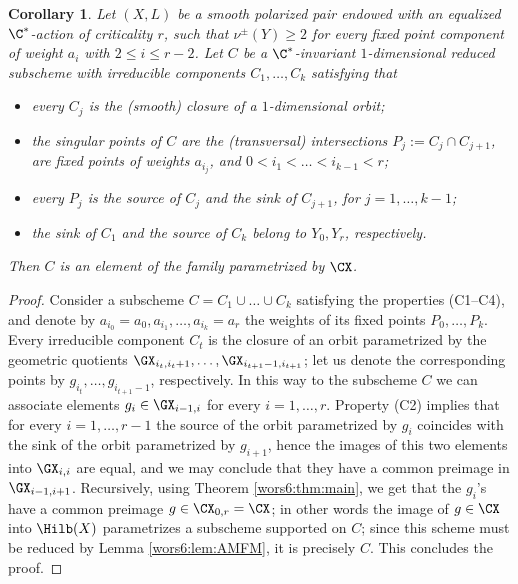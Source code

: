 \documentclass[reqno]{amsproc}
\newtheorem{corollary}[theorem]{Corollary}
\theoremstyle{definition}
\begin{document}
\begin{corollary}\label{wors6:cor:CXcontainsall}
Let $(X,L)$ be a smooth polarized pair endowed with an equalized $\C^*$-action of criticality $r$, such that $\nu^\pm(Y) \ge 2$ for every fixed point component of weight $a_i$ with $2 \le i \le r-2$.  Let $C$ be a $\C^*$-invariant $1$-dimensional reduced subscheme with irreducible components $C_1,\dots,C_k$ satisfying that 
\begin{itemize}
\item[(C1)] every $C_j$ is the (smooth) closure of a $1$-dimensional orbit; 
\item[(C2)] the singular points of $C$ are the (transversal) intersections $P_j:=C_j\cap C_{j+1}$, are fixed points of weights $a_{i_j}$, and  $0<i_1<\dots<i_{k-1}<r$; %
\item[(C3)] every $P_j$ is the source of $C_j$ and the sink of $C_{j+1}$, for $j=1,\dots,k-1$;  
\item[(C4)] the sink of $C_1$ and the source of $C_k$ belong to $Y_0,Y_r$, respectively.
\end{itemize}
Then $C$ is an element of the family parametrized by $\CX$.
\end{corollary}

\begin{proof}
Consider a subscheme $C=C_1\cup\dots \cup C_k$ satisfying the properties (C1--C4), and denote by $a_{i_0}=a_0,a_{i_1},\dots, a_{i_k}=a_r$ the weights of its fixed points $P_0,\dots,P_k$. Every irreducible component $C_t$ is the closure of an orbit parametrized by the geometric quotients $\GX_{i_t,i_t+1},\dots, \GX_{i_{t+1}-1,i_{t+1}}$; let us denote the corresponding points by $g_{i_t},\dots, g_{i_{t+1}-1}$, respectively. In this way to the subscheme $C$ we can associate elements $g_{i}\in\GX_{i-1,i}$ for every $i=1,\dots,r$. Property  (C2) implies that for every $i=1,\dots,r-1$ the source of the orbit parametrized by $g_i$ coincides with the sink of the orbit parametrized by $g_{i+1}$, hence the images of this two elements into $\GX_{i,i}$ are equal, and we may conclude that they have a common preimage in $\GX_{i-1,i+1}$. Recursively, using Theorem \ref{wors6:thm:main}, we get that the $g_i$'s have a common preimage $g\in\CX_{0,r}=\CX$; in other words the image of $g\in \CX$ into $\Hilb(X)$ parametrizes a subscheme supported on $C$; since this scheme must be reduced by Lemma \ref{wors6:lem:AMFM}, it is precisely $C$. This concludes the proof.
\end{proof}
\end{document}
